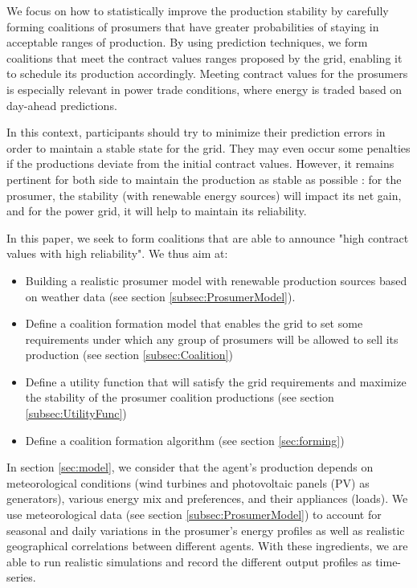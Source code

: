 \documentclass[conference]{IEEEtran}
\begin{document}
We focus on how to statistically improve the production stability by carefully forming coalitions of prosumers that have greater probabilities of staying in acceptable ranges of production. By using prediction techniques, we form coalitions that meet the contract values ranges proposed by the grid, enabling it to schedule its production accordingly. Meeting contract values for the prosumers is especially relevant in power trade conditions, where energy is traded based on day-ahead predictions. 

In this context, participants should try to minimize their prediction errors in order to maintain a stable state for the grid. They may even occur some penalties if the productions deviate from the initial contract values. However, it remains pertinent for both side to maintain the production as stable as possible : for the prosumer, the stability (with renewable energy sources) will impact its net gain, and for the power grid, it will help to maintain its reliability.

In this paper, we seek to form coalitions that are able to announce "high contract values with high reliability". We thus aim at:
\begin{itemize}
\item Building a realistic prosumer model with renewable production sources based on weather data (see section \ref{subsec:ProsumerModel}).
\item Define a coalition formation model that enables the grid to set some requirements under which any group of prosumers will be allowed to sell its production (see section \ref{subsec:Coalition})
\item Define a utility function that will satisfy the grid requirements and maximize the stability of the prosumer coalition productions (see section \ref{subsec:UtilityFunc})
\item Define a coalition formation algorithm (see section \ref{sec:forming})
\end{itemize}

In section \ref{sec:model}, we consider that the agent's production depends on meteorological conditions (wind turbines and photovoltaic panels (PV) as generators), various energy mix and preferences, and their appliances (loads). We use meteorological data (see section \ref{subsec:ProsumerModel}) to account for seasonal and daily variations in the prosumer's energy profiles as well as realistic geographical correlations between different agents. With these ingredients, we are able to run realistic simulations and record the different output profiles as time-series.
\end{document}
